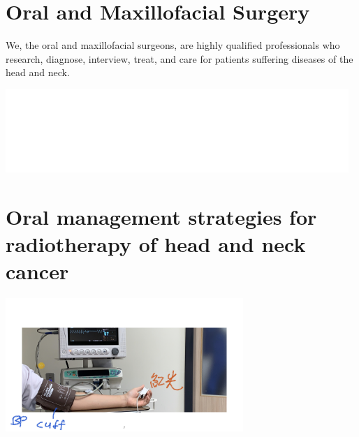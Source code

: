 \documentclass[
paper=landscape,
paper=160mm:90mm, %
fontsize=11pt, %
pagesize, %
parskip=half-, %
]{scrartcl} %
\theoremstyle{mythmstyle} %
\begin{document}
\section{Oral and Maxillofacial Surgery}

We, the oral and maxillofacial surgeons, are highly qualified professionals who research, diagnose, interview, treat, and care for patients suffering diseases of the head and neck.


\includegraphics[width=13cm]{TAOMS_LOGO.png}

\clearpage
\section{Oral management strategies for radiotherapy of head and neck cancer} %
\autocite{Kawashita2020}
\begin{center} %
    \centering
    \captionsetup{labelformat=empty}
    \includegraphics[width=9cm]{ContemporaryOMS_vitals.jpeg.001.jpeg}
\end{center}
\end{document}
